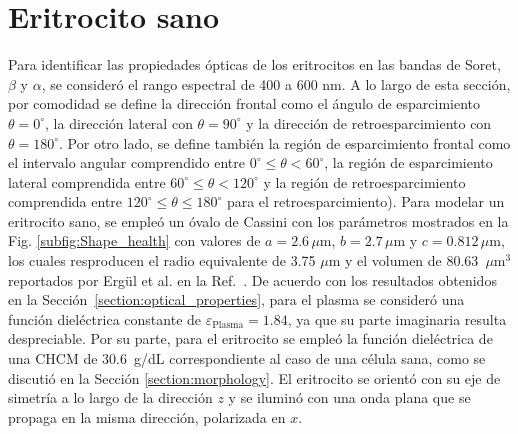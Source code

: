 
\section{Eritrocito sano}
\label{section:Res_Eritrocito_Sano}

Para identificar las propiedades ópticas de los eritrocitos en las bandas de Soret, $\beta$ y $\alpha$, se consideró el rango espectral de 400  a 600 nm.  A lo largo de esta sección, por comodidad se define la dirección frontal como el ángulo de esparcimiento $\theta=0^\circ$, la dirección lateral con $\theta=90^\circ$ y la dirección de retroesparcimiento con $\theta=180^\circ$. Por otro lado, se define también la región de esparcimiento frontal como el intervalo angular comprendido entre $0^\circ\leq\theta<60^\circ$, la región de esparcimiento lateral comprendida entre $60^\circ\leq\theta<120^\circ$ y la región de retroesparcimiento comprendida entre $120^\circ\leq\theta\leq180^\circ$ para el retroesparcimiento). Para modelar un eritrocito sano, se empleó un óvalo de Cassini con los parámetros mostrados en la Fig. \ref{subfig:Shape_health} con valores de $a=2.6\,\mu\text{m}$, $b=2.7\,\mu\text{m}$ y $c=0.812\,\mu\text{m}$, los cuales resproducen el radio equivalente de 3.75 $\mu$m y el volumen de 80.63~$\mu\text{m}^3$ reportados por Ergül et al. en la Ref.~\cite{ergulComputationalStudyScattering2010}. De acuerdo con los resultados obtenidos en la Sección~\ref{section:optical_properties}, para el plasma se consideró una función dieléctrica constante de $\varepsilon_{\text{Plasma}}=1.84$, ya que su parte imaginaria resulta despreciable. Por su parte, para el eritrocito se empleó la función dieléctrica de una CHCM de 30.6~g/dL correspondiente al caso de una célula sana, como se discutió en la Sección \ref{section:morphology}. El eritrocito se orientó con su eje de simetría a lo largo de la dirección $z$ y se iluminó con una onda plana que se propaga en la misma dirección, polarizada en $x$.

